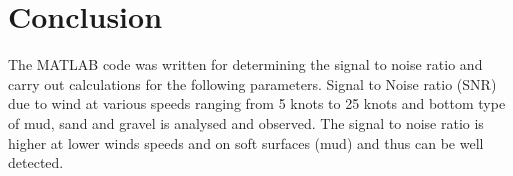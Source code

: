 \chapter*{Conclusion}

\noindent The MATLAB code was written for determining  the signal to noise ratio and carry out calculations for the following parameters. Signal to Noise ratio (SNR) due to wind at various speeds ranging from 5 knots to 25 knots and bottom type of mud, sand and gravel is analysed and observed. The signal to noise ratio is higher at lower winds speeds and on soft surfaces (mud) and thus can be well detected.



